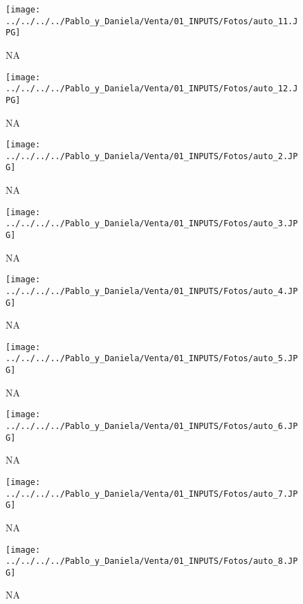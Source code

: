 \documentclass[
]{article}
\begin{document}
\pagebreak

\begin{figure}
\centering
\texttt{[image: ../../../../Pablo\_y\_Daniela/Venta/01\_INPUTS/Fotos/auto\_11.JPG]}
\caption{NA}
\end{figure}

\pagebreak

\begin{figure}
\centering
\texttt{[image: ../../../../Pablo\_y\_Daniela/Venta/01\_INPUTS/Fotos/auto\_12.JPG]}
\caption{NA}
\end{figure}

\pagebreak

\begin{figure}
\centering
\texttt{[image: ../../../../Pablo\_y\_Daniela/Venta/01\_INPUTS/Fotos/auto\_2.JPG]}
\caption{NA}
\end{figure}

\pagebreak

\begin{figure}
\centering
\texttt{[image: ../../../../Pablo\_y\_Daniela/Venta/01\_INPUTS/Fotos/auto\_3.JPG]}
\caption{NA}
\end{figure}

\pagebreak

\begin{figure}
\centering
\texttt{[image: ../../../../Pablo\_y\_Daniela/Venta/01\_INPUTS/Fotos/auto\_4.JPG]}
\caption{NA}
\end{figure}

\pagebreak

\begin{figure}
\centering
\texttt{[image: ../../../../Pablo\_y\_Daniela/Venta/01\_INPUTS/Fotos/auto\_5.JPG]}
\caption{NA}
\end{figure}

\pagebreak

\begin{figure}
\centering
\texttt{[image: ../../../../Pablo\_y\_Daniela/Venta/01\_INPUTS/Fotos/auto\_6.JPG]}
\caption{NA}
\end{figure}

\pagebreak

\begin{figure}
\centering
\texttt{[image: ../../../../Pablo\_y\_Daniela/Venta/01\_INPUTS/Fotos/auto\_7.JPG]}
\caption{NA}
\end{figure}

\pagebreak

\begin{figure}
\centering
\texttt{[image: ../../../../Pablo\_y\_Daniela/Venta/01\_INPUTS/Fotos/auto\_8.JPG]}
\caption{NA}
\end{figure}
\end{document}
